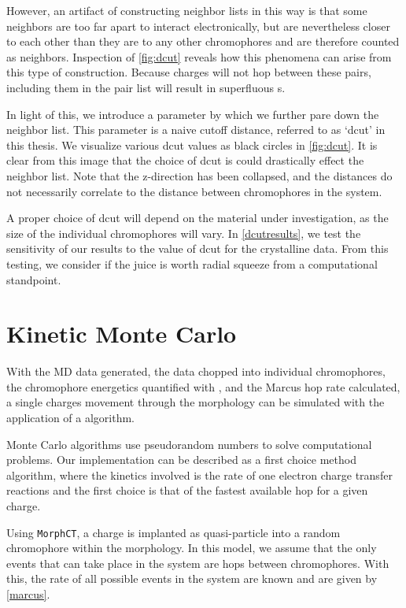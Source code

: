 However, an artifact of constructing neighbor lists in this way is that some
neighbors are too far apart to interact electronically, but are nevertheless closer to each other than they
are to any other chromophores and are therefore counted as neighbors. 
Inspection of \autoref{fig:dcut} reveals how this phenomena can arise from this type of construction.
Because charges will not hop between these pairs, including them in the pair list will result in 
superfluous s. 

In light of this, we introduce a parameter by which we further pare down the neighbor list. This parameter is
a naive cutoff distance, referred to as `dcut' in this thesis. We visualize various dcut values as black
circles in \autoref{fig:dcut}.
It is clear from this image that the choice of dcut is could drastically effect the
neighbor list.  
Note that the z-direction has been collapsed, and the distances do not necessarily correlate to the distance
between chromophores in the system.

A proper choice of dcut will depend on the material under investigation, 
as the size of the individual chromophores will vary. In 
\autoref{dcutresults}, we test the sensitivity of our results to the value of dcut for the crystalline 
data. From this testing, we consider if the juice is worth radial squeeze from a computational standpoint. 

\section{Kinetic Monte Carlo}
\label{KMC}

With the MD data generated, the data chopped into individual chromophores, 
the chromophore energetics
quantified with , and the Marcus hop rate calculated, 
a single charges movement through the morphology can be simulated with the
application of a  algorithm.

Monte Carlo algorithms use pseudorandom numbers to solve computational problems. Our implementation can be
described as a first choice method  algorithm, where the kinetics involved is the rate of one electron
charge transfer reactions and the first choice is that of the fastest available hop for a given charge.

Using \texttt{MorphCT}, a charge is implanted as quasi-particle into a random chromophore within 
the morphology. In this model, we assume that the only events that can take place in the system are hops
between chromophores. With this, the rate of all possible events in the system are known and are given by
\autoref{marcus}. 


